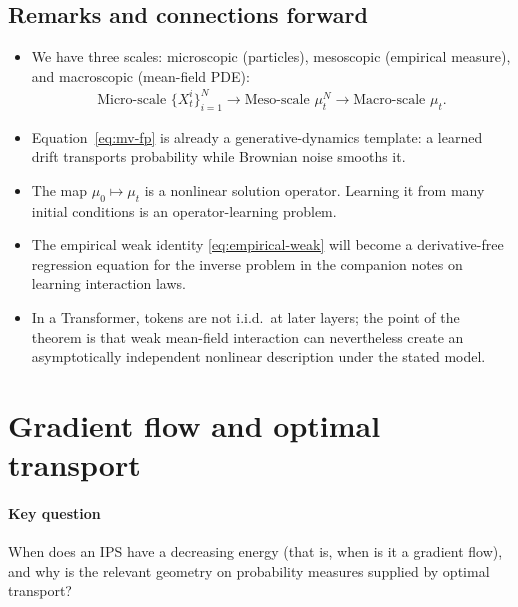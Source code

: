 \documentclass[11pt]{amsart}
\numberwithin{equation}{section}
\theoremstyle{plain}
\begin{document}
\subsection{Remarks and connections forward}
\begin{itemize}[leftmargin=*]
  \item We have three scales: microscopic (particles), mesoscopic (empirical measure), and macroscopic (mean-field PDE):
 \begin{align*}
   \text{Micro-scale }  \{X_t^i\}_{i=1}^N  \longrightarrow \text{Meso-scale }   \mu_t^N \longrightarrow \text{Macro-scale } \mu_t .
 \end{align*}

  \item Equation~\eqref{eq:mv-fp} is already a generative-dynamics template:
  a learned drift transports probability while Brownian noise smooths it.
  \item The map $\mu_0\mapsto\mu_t$ is a nonlinear solution operator.  Learning
  it from many initial conditions is an operator-learning problem.
  \item The empirical weak identity \eqref{eq:empirical-weak} will become a
  derivative-free regression equation for the inverse problem in
  the companion notes on learning interaction laws.
  \item In a Transformer, tokens are not i.i.d.\ at later layers; the point of
  the theorem is that weak mean-field interaction can nevertheless create an
  asymptotically independent nonlinear description under the stated model.
\end{itemize}



\section{Gradient flow and optimal transport}\label{sec:gradient-flow}

\paragraph{\textbf{Key question}}
When does an IPS have a decreasing energy (that is, when is it a gradient
flow),
and why is the relevant geometry on probability measures supplied by optimal
transport?
\end{document}
